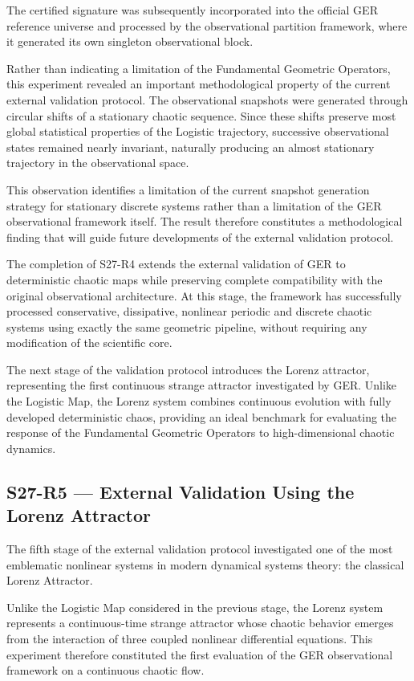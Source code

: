 The certified signature was subsequently incorporated into the official GER reference universe and processed by the observational partition framework, where it generated its own singleton observational block.

Rather than indicating a limitation of the Fundamental Geometric Operators, this experiment revealed an important methodological property of the current external validation protocol. The observational snapshots were generated through circular shifts of a stationary chaotic sequence. Since these shifts preserve most global statistical properties of the Logistic trajectory, successive observational states remained nearly invariant, naturally producing an almost stationary trajectory in the observational space.

This observation identifies a limitation of the current snapshot generation strategy for stationary discrete systems rather than a limitation of the GER observational framework itself. The result therefore constitutes a methodological finding that will guide future developments of the external validation protocol.

The completion of S27-R4 extends the external validation of GER to deterministic chaotic maps while preserving complete compatibility with the original observational architecture. At this stage, the framework has successfully processed conservative, dissipative, nonlinear periodic and discrete chaotic systems using exactly the same geometric pipeline, without requiring any modification of the scientific core.

The next stage of the validation protocol introduces the Lorenz attractor, representing the first continuous strange attractor investigated by GER. Unlike the Logistic Map, the Lorenz system combines continuous evolution with fully developed deterministic chaos, providing an ideal benchmark for evaluating the response of the Fundamental Geometric Operators to high-dimensional chaotic dynamics.

\subsection{S27-R5 --- External Validation Using the Lorenz Attractor}

The fifth stage of the external validation protocol investigated one of the most emblematic nonlinear systems in modern dynamical systems theory: the classical Lorenz Attractor.

Unlike the Logistic Map considered in the previous stage, the Lorenz system represents a continuous-time strange attractor whose chaotic behavior emerges from the interaction of three coupled nonlinear differential equations. This experiment therefore constituted the first evaluation of the GER observational framework on a continuous chaotic flow.

